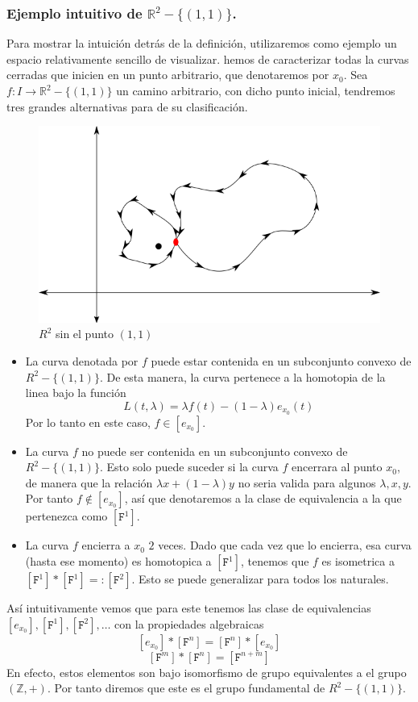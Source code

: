 {\subsubsection{Ejemplo intuitivo de \(\mathbb{R}^2 - \{(1,1)\}\).}
Para mostrar la intuición detrás de la definición, utilizaremos como
ejemplo un espacio relativamente sencillo de visualizar. hemos de
caracterizar todas la curvas cerradas que inicien en un punto
arbitrario, que denotaremos por \(x_0\). Sea \(f : I \to \mathbb{R}^2 -
\{(1,1)\}\) un camino arbitrario, con dicho punto inicial, tendremos
tres grandes alternativas para de su clasificación.
\begin{figure}[h]
  \centering
  \includegraphics[scale=0.5]{./imagenes/R2-punto.png}
  \caption{\(R^2\) sin el punto \((1,1)\)}
  \label{fig:R2-sin-punto}
\end{figure}
\begin{itemize}
\item La curva denotada por \(f\) puede estar contenida en un subconjunto
  convexo de \(R^2 - \{(1,1)\}\). De esta manera, la curva pertenece a la
  homotopia de la linea bajo la función
  \[ L (t,\lambda) = \lambda f (t) - (1 - \lambda) e_{x_0} (t)\]
  Por lo tanto en este caso, \(f \in [e_{x_0}]\).
\item La curva \(f\) no puede ser contenida en un subconjunto convexo de
  \(R^2 - \{ (1,1)\}\). Esto solo puede suceder si la curva \(f\)
  encerrara al punto \(x_0\), de manera que la relación \(\lambda x +
  (1 - \lambda) y\) no seria valida para algunos \(\lambda, x, y\). Por
  tanto \(f \not \in [e_{x_0}]\), así que denotaremos a la clase de
  equivalencia a la que pertenezca como \([\mathtt{F}^1]\).
\item La curva \(f\) encierra a \(x_0\) \(2\) veces. Dado que cada vez
  que lo encierra, esa curva (hasta ese momento) es homotopica a
  \([\mathtt F ^1]\), tenemos que \(f\) es isometrica a \( [\mathtt F
  ^1] * [\mathtt F ^1] =: [\mathtt F ^2]\). Esto se puede generalizar
  para todos los naturales.
\end{itemize}
Así intuitivamente vemos que para este tenemos las clase de
equivalencias \([e_{x_0}], [\mathtt F ^1], [\mathtt F ^2], \dots \) con
la propiedades algebraicas
\[ [e_{x_0}] * [\mathtt F ^n] = [\mathtt F ^n] * [e_{x_0}]\]
\[ [\mathtt F ^m]  * [\mathtt F ^n] = [\mathtt F ^{n + m}]\]
En efecto, estos elementos son bajo isomorfismo de grupo equivalentes a
el grupo \((\mathbb{Z}, +)\). Por tanto diremos que este es el grupo
fundamental de \(R^2 - \{(1,1)\}\).

}
